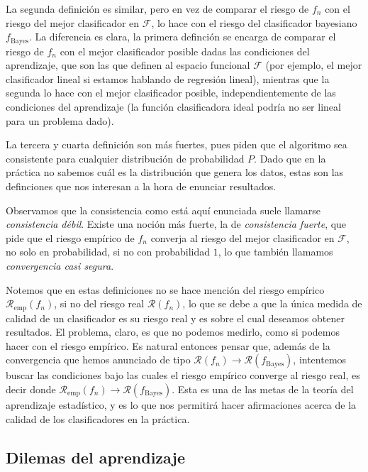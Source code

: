 \documentclass{report}
\begin{document}
La segunda definición es similar, pero en vez de comparar el riesgo de $f_n$ con el riesgo del mejor clasificador en $\mathcal{F}$,
lo hace con el riesgo del clasificador bayesiano $f_{\text{Bayes}}$. La diferencia es clara, la primera definción se encarga de
comparar el riesgo de $f_n$ con el mejor clasificador posible dadas las condiciones del aprendizaje, que son las que definen al espacio funcional
$\mathcal{F}$ (por ejemplo, el mejor clasificador lineal si estamos hablando de regresión lineal), mientras que la segunda lo hace con el
mejor clasificador posible, independientemente de las condiciones del aprendizaje (la función clasificadora ideal podría no ser lineal
para un problema dado).

La tercera y cuarta definición son más fuertes, pues piden que el algoritmo sea consistente para cualquier distribución de probabilidad $P$.
Dado que en la práctica no sabemos cuál es la distribución que genera los datos, estas son las definciones que nos interesan a la hora de
enunciar resultados.

Observamos que la consistencia como está aquí enunciada suele llamarse \textit{consistencia débil}. Existe una noción más fuerte, la de
\textit{consistencia fuerte}, que pide que el riesgo empírico de $f_n$ converja al riesgo del mejor clasificador en $\mathcal{F}$, no solo
en probabilidad, si no con probabilidad $1$, lo que también llamamos \textit{convergencia casi segura}.

Notemos que en estas definiciones no se hace mención del riesgo empírico $\mathcal{R}_{\text{emp}}(f_n)$, si no del riesgo real $\mathcal{R}(f_n)$, lo que
se debe a que la única medida de calidad de un clasificador es su riesgo real y es sobre el cual deseamos obtener resultados. El problema, claro,
es que no podemos medirlo, como si podemos hacer con el riesgo empírico. Es natural entonces pensar que, además de la convergencia que hemos anunciado
de tipo $\mathcal{R}(f_n) \rightarrow \mathcal{R}(f_{\text{Bayes}})$, intentemos buscar las condiciones bajo las cuales el riesgo empírico
converge al riesgo real, es decir donde  $\mathcal{R}_{\text{emp}}(f_n) \rightarrow \mathcal{R}(f_{\text{Bayes}})$. Esta es una de las metas
de la teoría del aprendizaje estadístico, y es lo que nos permitirá hacer afirmaciones acerca de la calidad de los clasificadores en la práctica.


\subsection{Dilemas del aprendizaje}
\end{document}
